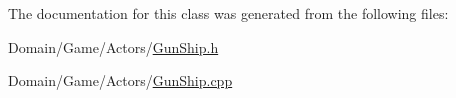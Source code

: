 The documentation for this class was generated from the following files\+:\begin{DoxyCompactItemize}
\item 
Domain/\+Game/\+Actors/\hyperlink{GunShip_8h}{Gun\+Ship.\+h}\item 
Domain/\+Game/\+Actors/\hyperlink{GunShip_8cpp}{Gun\+Ship.\+cpp}\end{DoxyCompactItemize}
